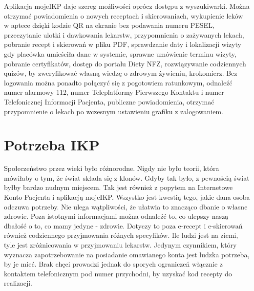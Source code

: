 \documentclass[11pt,a4paper]{article}
\begin{document}
Aplikacja mojeIKP daje szereg możliwości oprócz dostępu z wyszukiwarki. Można otrzymać powiadomienia o nowych receptach i skierowaniach, wykupienie leków w aptece dzięki kodzie QR na ekranie bez podawania numeru PESEL, przeczytanie ulotki i dawkowania lekarstw, przypomnienia o zażywanych lekach, pobranie recept i skierowań w pliku PDF, sprawdzanie daty i lokalizacji wizyty gdy placówka umieściła dane w systemie, sprawne umówienie terminu wizyty, pobranie certyfikatów, dostęp do portalu Diety NFZ, rozwiązywanie codziennych quizów, by zweryfikować własną wiedzę o zdrowym żywieniu, krokomierz. Bez logowania można ponadto połączyć się z pogotowiem ratunkowym, odnaleźć numer alarmowy 112, numer Teleplatformy Pierwszego Kontaktu i numer Telefonicznej Informacji Pacjenta, publiczne powiadomienia, otrzymać przypomnienie o lekach po wczesnym ustawieniu grafiku z zalogowaniem.

\section{Potrzeba IKP}
Społeczeństwo przez wieki było różnorodne. Nigdy nie było teorii, która mówiłaby o tym, że świat składa się z klonów. Gdyby tak było, z pewnością świat byłby bardzo nudnym miejscem. Tak jest również z popytem na Internetowe Konto Pacjenta i aplikacją mojeIKP. Wszystko jest kwestią tego, jakie dana osoba odczuwa potrzeby. Nie ulega wątpliwości, że ułatwia to znacząco dbanie o własne zdrowie. Poza istotnymi informacjami można odnaleźć to, co ulepszy naszą dbałość o to, co mamy jedyne - zdrowie. Dotyczy to poza e-recept i e-skierowań również codziennego przyjmowania różnych specyfików. Ile ludzi jest na ziemi, tyle jest zróżnicowania w przyjmowaniu lekarstw. Jedynym czynnikiem, który wyznacza zapotrzebowanie na posiadanie omawianego konta jest ludzka potrzeba, by je mieć. Brak chęci prowadzi jednak do sporych ograniczeń włącznie z kontaktem telefonicznym pod numer przychodni, by uzyskać kod recepty do realizacji.
\end{document}
